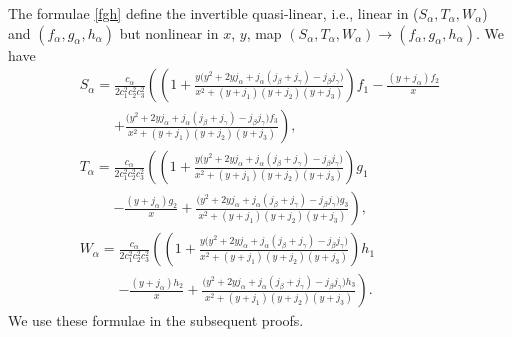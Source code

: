 \documentclass[10pt,a4paper]{amsart}
\def\a{\alpha}
\def\b{\beta}
\def\g{\gamma}
\numberwithin{equation}{section}
\begin{document}
The formulae \eqref{fgh} define the invertible quasi-linear, i.e., linear in ($S_{\a}, T_{\a}, W_{\a}$) and $(f_{\a}, g_{\a},\allowbreak h_{\a})$ but nonlinear in $x$, $y$, map $(S_{\a}, T_{\a}, W_{\a}) \rightarrow (f_{\a}, g_{\a}, h_{\a})$. We have
\begin{subequations}\label{STW}
\begin{gather}
 S_{\a}=\frac{c_{\a}}{2 c_1^2c_2^2c_3^2 }\left( \left(1+\frac{y \big(y^2+2 y j_{\a}+j_{\a} (j_{\b}+j_{\g})-j_{\b} j_{\g}\big)}{x^2+(y+j_{1}) (y+j_2) (y+j_3)}\right) f_1-
 \frac{(y+j_{\a}) f_2}{x}\right.\nonumber\\
\phantom{S_{\a}=}{}
\left.+\frac{\big(y^2+2 y j_{\a}+j_{\a} (j_{\b}+j_{\g})-j_{\b} j_{\g}\big) f_3}{x^2+(y+j_1) (y+j_2) (y+j_3)}
 \right),
\\
 T_{\a}= \frac{c_{\a}}{2 c_1^2c_2^2c_3^2 }\left( \left(1+\frac{y \big(y^2+2 y j_{\a}+j_{\a} (j_{\b}+j_{\g})-j_{\b} j_{\g}\big)}{x^2+(y+j_{1}) (y+j_2) (y+j_3)}\right) g_1\right.\nonumber\\
\phantom{T_{\a}= }{}
\left.- \frac{(y+j_{\a}) g_2}{x}+\frac{\big(y^2+2 y j_{\a}+j_{\a} (j_{\b}+j_{\g})-j_{\b} j_{\g}\big) g_3}{x^2+(y+j_1) (y+j_2) (y+j_3)}
 \right),
\\
 W_{\a}=\frac{c_{\a}}{2 c_1^2c_2^2c_3^2 }\left( \left(1+\frac{y \big(y^2+2 y j_{\a}+j_{\a} (j_{\b}+j_{\g})-j_{\b} j_{\g}\big)}{x^2+(y+j_{1}) (y+j_2) (y+j_3)}\right) h_1\right.\nonumber\\
 \phantom{W_{\a}=}{}
 \left.-\frac{(y+j_{\a}) h_2}{x}+\frac{\big(y^2+2 y j_{\a}+j_{\a} (j_{\b}+j_{\g})-j_{\b} j_{\g}\big) h_3}{x^2+(y+j_1) (y+j_2) (y+j_3)}
 \right).
 \end{gather}
\end{subequations}
We use these formulae in the subsequent proofs.
\end{document}
